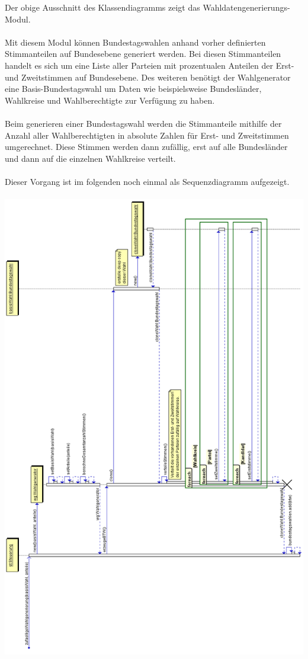 \documentclass[12pt,a4paper,titlepage]{article}
\begin{document}
Der obige Ausschnitt des Klassendiagramms zeigt das Wahldatengenerierungs-Modul.\\\\
Mit diesem Modul können Bundestagswahlen anhand vorher definierten Stimmanteilen auf Bundesebene generiert werden. Bei diesen Stimmanteilen handelt es sich um eine Liste aller Parteien mit prozentualen Anteilen der Erst- und Zweitstimmen auf Bundesebene. Des weiteren benötigt der Wahlgenerator eine Basis-Bundestagswahl um Daten wie beispielsweise Bundesländer, Wahlkreise und Wahlberechtigte zur Verfügung zu haben.\\\\
Beim generieren einer Bundestagswahl werden die Stimmanteile mithilfe der Anzahl aller Wahlberechtigten in absolute Zahlen für Erst- und Zweitstimmen umgerechnet. Diese Stimmen werden dann zufällig, erst auf alle Bundesländer und dann auf die einzelnen Wahlkreise verteilt.\\\\
Dieser Vorgang ist im folgenden noch einmal als Sequenzdiagramm aufgezeigt.\\\\
\includegraphics[scale=0.5]{zufaelligeWahlgenerierung_Sequenzdiagramm.png}
\end{document}
